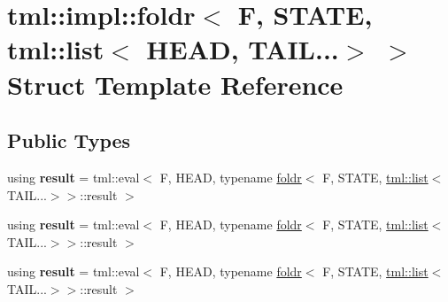 \hypertarget{structtml_1_1impl_1_1foldr_3_01F_00_01STATE_00_01tml_1_1list_3_01HEAD_00_01TAIL_8_8_8_4_01_4}{\section{tml\+:\+:impl\+:\+:foldr$<$ F, S\+T\+A\+T\+E, tml\+:\+:list$<$ H\+E\+A\+D, T\+A\+I\+L...$>$ $>$ Struct Template Reference}
\label{structtml_1_1impl_1_1foldr_3_01F_00_01STATE_00_01tml_1_1list_3_01HEAD_00_01TAIL_8_8_8_4_01_4}
}
\subsection*{Public Types}
\begin{DoxyCompactItemize}
\item 
\hypertarget{structtml_1_1impl_1_1foldr_3_01F_00_01STATE_00_01tml_1_1list_3_01HEAD_00_01TAIL_8_8_8_4_01_4_a5e287ad078f869f460004bbb33f55fa1}{using {\bfseries result} = tml\+::eval$<$ F, H\+E\+A\+D, typename \hyperlink{structtml_1_1impl_1_1foldr}{foldr}$<$ F, S\+T\+A\+T\+E, \hyperlink{structtml_1_1list}{tml\+::list}$<$ T\+A\+I\+L...$>$$>$\+::result $>$}\label{structtml_1_1impl_1_1foldr_3_01F_00_01STATE_00_01tml_1_1list_3_01HEAD_00_01TAIL_8_8_8_4_01_4_a5e287ad078f869f460004bbb33f55fa1}

\item 
\hypertarget{structtml_1_1impl_1_1foldr_3_01F_00_01STATE_00_01tml_1_1list_3_01HEAD_00_01TAIL_8_8_8_4_01_4_a5e287ad078f869f460004bbb33f55fa1}{using {\bfseries result} = tml\+::eval$<$ F, H\+E\+A\+D, typename \hyperlink{structtml_1_1impl_1_1foldr}{foldr}$<$ F, S\+T\+A\+T\+E, \hyperlink{structtml_1_1list}{tml\+::list}$<$ T\+A\+I\+L...$>$$>$\+::result $>$}\label{structtml_1_1impl_1_1foldr_3_01F_00_01STATE_00_01tml_1_1list_3_01HEAD_00_01TAIL_8_8_8_4_01_4_a5e287ad078f869f460004bbb33f55fa1}

\item 
\hypertarget{structtml_1_1impl_1_1foldr_3_01F_00_01STATE_00_01tml_1_1list_3_01HEAD_00_01TAIL_8_8_8_4_01_4_a5e287ad078f869f460004bbb33f55fa1}{using {\bfseries result} = tml\+::eval$<$ F, H\+E\+A\+D, typename \hyperlink{structtml_1_1impl_1_1foldr}{foldr}$<$ F, S\+T\+A\+T\+E, \hyperlink{structtml_1_1list}{tml\+::list}$<$ T\+A\+I\+L...$>$$>$\+::result $>$}\label{structtml_1_1impl_1_1foldr_3_01F_00_01STATE_00_01tml_1_1list_3_01HEAD_00_01TAIL_8_8_8_4_01_4_a5e287ad078f869f460004bbb33f55fa1}

\end{DoxyCompactItemize}
